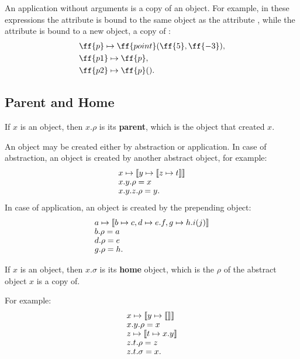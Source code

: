 An application without arguments is a copy of an object. For example,
in these expressions the attribute  is bound to the same object
as the attribute , while the attribute  is bound to a new
object, a copy of :
\begin{equation*}
\begin{split}
& \ff{p} \mapsto \ff{point}(\ff{5}, \ff{-3}),\\
& \ff{p1} \mapsto \ff{p},\\
& \ff{p2} \mapsto \ff{p}().\\
\end{split}
\end{equation*}

\subsection{Parent and Home}

\begin{eodefinition}\label{def:parent}
If $x$ is an object, then $x.\rho$ is its \textbf{parent},
which is the object that created $x$.
\end{eodefinition}

An object may be created either by
abstraction or application. In case of abstraction, an object
is created by another abstract object, for example:
  \begin{equation}
  \begin{split}
  & x \mapsto \llbracket y \mapsto \llbracket z \mapsto t \rrbracket \rrbracket \br
  & x.y.\rho = x \br
  & x.y.z.\rho = y.
  \end{split}
  \end{equation}
In case of application, an object is created by the prepending object:
  \begin{equation}
  \begin{split}
  & a \mapsto \llbracket b \mapsto c, d \mapsto e.f, g \mapsto h.i(j) \rrbracket \br
  & b.\rho = a \br
  & d.\rho = e \br
  & g.\rho = h.
  \end{split}
  \end{equation}

\begin{eodefinition}\label{def:home}
If $x$ is an object, then $x.\sigma$ is its \textbf{home} object, which
is the $\rho$ of the abstract object $x$ is a copy of.
\end{eodefinition}

For example:
\begin{equation}
\begin{split}
& x \mapsto \llbracket y \mapsto \llbracket \rrbracket \rrbracket \br
& x.y.\rho = x \br
& z \mapsto \llbracket t \mapsto x.y \rrbracket \br
& z.t.\rho = z \br
& z.t.\sigma = x.
\end{split}
\end{equation}

